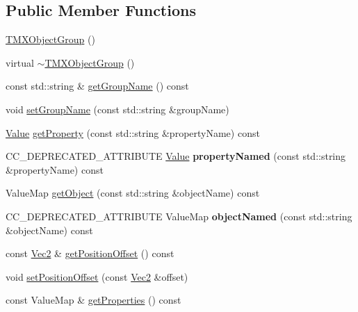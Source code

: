 \subsection*{Public Member Functions}
\begin{DoxyCompactItemize}
\item 
\hyperlink{classTMXObjectGroup_a0b06a8d289ff2f2620323040a030b5ed}{T\+M\+X\+Object\+Group} ()
\item 
virtual \hyperlink{classTMXObjectGroup_a7de6a688a370891712675e145bc77c75}{$\sim$\+T\+M\+X\+Object\+Group} ()
\item 
const std\+::string \& \hyperlink{classTMXObjectGroup_a64c2197f8730ebd449086e0c1ee4d3f7}{get\+Group\+Name} () const
\item 
void \hyperlink{classTMXObjectGroup_aafffef23335ae841700cfddde5e6301c}{set\+Group\+Name} (const std\+::string \&group\+Name)
\item 
\hyperlink{classValue}{Value} \hyperlink{classTMXObjectGroup_a8cf30e4dc195b522f044efa6af6b2690}{get\+Property} (const std\+::string \&property\+Name) const
\item 
\mbox{\label{classTMXObjectGroup_aba5477c58f17fe03931f4d62ae86c456}} 
C\+C\+\_\+\+D\+E\+P\+R\+E\+C\+A\+T\+E\+D\+\_\+\+A\+T\+T\+R\+I\+B\+U\+TE \hyperlink{classValue}{Value} {\bfseries property\+Named} (const std\+::string \&property\+Name) const
\item 
Value\+Map \hyperlink{classTMXObjectGroup_adc5371f496124537ac76e97426a8f5db}{get\+Object} (const std\+::string \&object\+Name) const
\item 
\mbox{\label{classTMXObjectGroup_a7de2a7302290f38dae44110d64bf5fff}} 
C\+C\+\_\+\+D\+E\+P\+R\+E\+C\+A\+T\+E\+D\+\_\+\+A\+T\+T\+R\+I\+B\+U\+TE Value\+Map {\bfseries object\+Named} (const std\+::string \&object\+Name) const
\item 
const \hyperlink{classVec2}{Vec2} \& \hyperlink{classTMXObjectGroup_aa11982f548c2a8fe561c882201f82e29}{get\+Position\+Offset} () const
\item 
void \hyperlink{classTMXObjectGroup_a0280a11095c886a5e3f195f40377dd20}{set\+Position\+Offset} (const \hyperlink{classVec2}{Vec2} \&offset)
\item 
const Value\+Map \& \hyperlink{classTMXObjectGroup_a182c7a7b7ed113bf2c974fcfff818d28}{get\+Properties} () const
\item 
\mbox{\label{classTMXObjectGroup_a6ffcb9e173bcad84d14e784515525347}} 

\end{DoxyCompactItemize}
